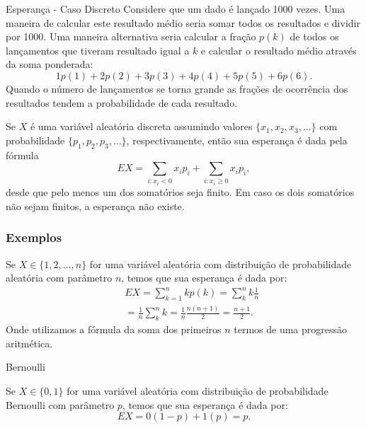 \begin{frame}
\begin{block}{Esperança - Caso Discreto}
Considere que um dado é lançado 1000 vezes. Uma maneira de
calcular este resultado médio seria somar todos os resultados e
dividir por 1000. Uma maneira alternativa seria calcular a fração
$p(k)$ de todos os lançamentos que tiveram resultado igual a $k$ e
calcular o resultado médio através da soma ponderada:
$$1p(1)+2p(2)+3p(3)+4p(4)+5p(5)+6p(6).$$
Quando o número de lançamentos se torna grande as frações de
ocorrência dos resultados tendem a probabilidade de cada resultado.
\end{block}

\begin{defi}
	Se $X$ é uma variável aleatória discreta assumindo valores
	$\{x_1,x_2,x_3,\ldots\}$ com probabilidade $\{p_1,p_2,p_3,\ldots\}$,
	respectivamente, então sua esperança é dada pela fórmula
	$$EX=\sum_{i:x_i<0}x_ip_i+\sum_{i:x_i\geq 0}x_ip_i,$$
	desde que pelo menos um dos somatórios seja finito. Em caso os dois
	somatórios não sejam finitos, a esperança não existe.
\end{defi}
\end{frame}

\begin{frame}
\frametitle{Exemplos}
\begin{exem}[Aleatória]
Se $X\in\{1,2,\ldots,n\}$ for uma variável aleatória
com distribuição de probabilidade aleatória com parâmetro $n$, temos
que sua esperança é dada por:
\begin{eqnarray}
& & EX=\sum_{k=1}^{n}kp(k)=\sum_{k}^n k{\frac{1}{n}} \nonumber \\
& & =\frac{1}{n}\sum_{k}^n k=\frac{1}{n}\frac{n(n+1)}{2}=\frac{n+1}{2}.\nonumber
\end{eqnarray}
Onde utilizamos a fórmula da soma dos primeiros $n$ termos de uma
progressão aritmética.
\end{exem}

\begin{exem}{Bernoulli}

Se $X\in\{0,1\}$ for uma variável aleatória
com distribuição de probabilidade Bernoulli com parâmetro $p$, temos
que sua esperança é dada por:
$$EX=0(1-p)+1(p)=p.$$

\end{exem}
\end{frame}

